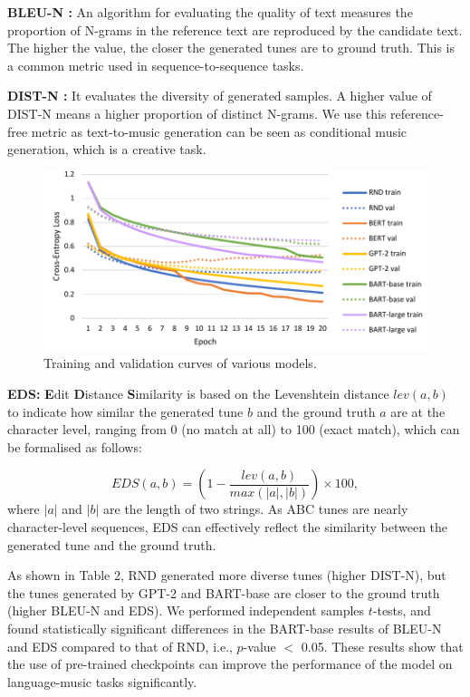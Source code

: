 \documentclass[letterpaper]{article} %
\begin{document}
\textbf{BLEU-N \cite{papineni-etal-2002-bleu}:} An algorithm for evaluating the quality of text measures the proportion of N-grams in the reference text are reproduced by the candidate text. The higher the value, the closer the generated tunes are to ground truth. This is a common metric used in sequence-to-sequence tasks.

\textbf{DIST-N \cite{DBLP:conf/naacl/LiGBGD16}:} It evaluates the diversity of generated samples. A higher value of DIST-N means a higher proportion of distinct N-grams. We use this reference-free metric as text-to-music generation can be seen as conditional music generation, which is a creative task.

\begin{figure}[t]
	\centering
		\begin{minipage}{8.5cm}
                        \includegraphics[width=\textwidth]{fig1.pdf}
		\end{minipage}
    \centering
	\caption{Training and validation curves of various models.}
\end{figure}

\textbf{EDS:} \textbf{E}dit \textbf{D}istance \textbf{S}imilarity is based on the Levenshtein distance $lev(a,b)$ to indicate how similar the generated tune $b$ and the ground truth $a$ are at the character level, ranging from 0 (no match at all) to 100 (exact match), which can be formalised as follows:

\begin{equation}
    EDS(a,b) = (1 - \frac{lev(a,b)}{max(|a|,|b|)})\times 100,
\end{equation}
\noindent
where $|a|$ and $|b|$ are the length of two strings. As ABC tunes are nearly character-level sequences, EDS can effectively reflect the similarity between the generated tune and the ground truth.

As shown in Table 2, RND generated more diverse tunes (higher DIST-N), but the tunes generated by GPT-2 and BART-base are closer to the ground truth (higher BLEU-N and EDS). We performed independent samples $t$-tests, and found statistically significant differences in the BART-base results of BLEU-N and EDS compared to that of RND, i.e., $p$-value $<$ 0.05. These results show that the use of pre-trained checkpoints can improve the performance of the model on language-music tasks significantly.
\end{document}
